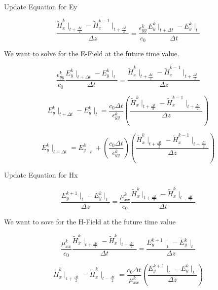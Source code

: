\documentclass[a4paper,10pt]{article}
\begin{document}
Update Equation for Ey

\begin{equation*}
  \frac{\tilde{H}_{x}^{k}\mid_{t+\frac{\Delta t}{2}} - \tilde{H}_{x}^{k-1}\mid_{t+\frac  {\Delta t}{2}}}{\Delta z} = \frac{\epsilon_{yy}^{k}}{c_0} \frac{E_{y}^{k}\mid_{t+\Delta t} - E_{y}^{k}\mid_{t}}{\Delta t}
\end{equation*}

We want to solve for the E-Field at the future time value.

\begin{equation*}
  \frac{\epsilon_{yy}^{k}}{c_0} \frac{E_{y}^{k}\mid_{t+\Delta t} - E_{y}^{k}\mid_{t}}{\Delta t} = \frac{\tilde{H}_{x}^{k}\mid_{t+\frac{\Delta t}{2}} - \tilde{H}_{x}^{k-1}\mid_{t+\frac  {\Delta t}{2}}}{\Delta z}
\end{equation*}

\begin{equation*}
  E_{y}^{k}\mid_{t+\Delta t} - E_{y}^{k}\mid_{t} = \frac{c_0\Delta t}{\epsilon_{yy}^{k}} \left(\frac{\tilde{H}_{x}^{k}\mid_{t+\frac{\Delta t}{2}} - \tilde{H}_{x}^{k-1}\mid_{t+\frac  {\Delta t}{2}}}{\Delta z}\right)
\end{equation*}

\begin{equation}
  E_{y}^{k}\mid_{t+\Delta t} = E_{y}^{k}\mid_{t} + \left(\frac{c_0\Delta t}{\epsilon_{yy}^{k}}\right) \left( \frac{\tilde{H}_{x}^{k}\mid_{t+\frac{\Delta t}{2}} - \tilde{H}_{x}^{k-1}\mid_{t+\frac  {\Delta t}{2}}}{\Delta z}\right)
\end{equation}


Update Equation for Hx

\begin{equation*}
  \frac{E_{y}^{k+1}\mid_{t} - E_{y}^{k}\mid_{t}}{\Delta z} = \frac{\mu_{xx}^{k}}{c_0} \frac{\tilde{H}_{x}^{k}\mid_{t+\frac  {\Delta t}{2}} - \tilde{H}_{x}^{k}\mid_{t-\frac{\Delta t}{2}}}{\Delta t}
\end{equation*}

We want to sove for the H-Field at the future time value

\begin{equation*}
  \frac{\mu_{xx}^{k}}{c_0} \frac{\tilde{H}_{x}^{k}\mid_{t+\frac  {\Delta t}{2}} - \tilde{H}_{x}^{k}\mid_{t-\frac{\Delta t}{2}}}{\Delta t} = \frac{E_{y}^{k+1}\mid_{t} - E_{y}^{k}\mid_{t}}{\Delta z}
\end{equation*}

\begin{equation*}
  \tilde{H}_{x}^{k}\mid_{t+\frac{\Delta t}{2}} - \tilde{H}_{x}^{k}\mid_{t-\frac{\Delta t}{2}} = \frac{c_0\Delta t}{\mu_{xx}^{k}}\left(\frac{E_{y}^{k+1}\mid_{t} - E_{y}^{k}\mid_{t}}{\Delta z}\right)
\end{equation*}
\end{document}
